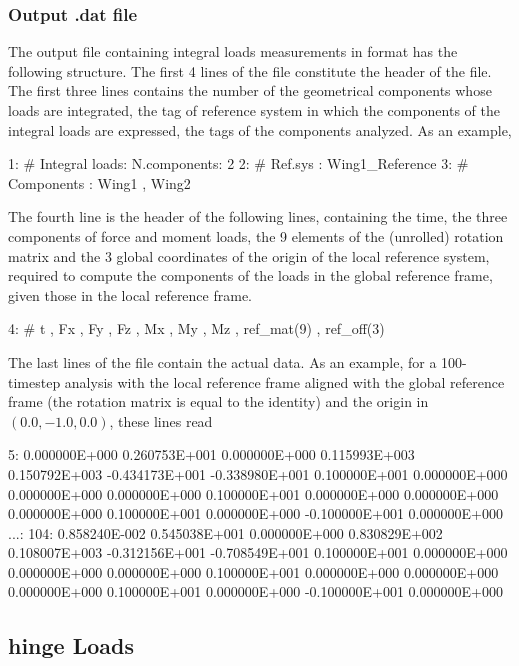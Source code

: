 \subsubsection{Output .dat file}
The output file containing integral loads measurements in  format has 
the following structure.
The first 4 lines of the file constitute the header of the file. The first three 
lines contains the number of the geometrical components  whose loads 
are integrated, the tag of reference system in which the components of the integral 
loads are expressed, the tags of the  components analyzed. As an example,
\begin{inputfile}
  1:  # Integral loads: N.components: 2
  2:  #                 Ref.sys     : Wing1_Reference
  3:  #                 Components  : Wing1 , Wing2
\end{inputfile}
The fourth line is the header of the following lines, containing the time, 
the three components of force and moment loads, the 9 elements of the (unrolled) 
rotation matrix and the 3 global coordinates of the origin of the local reference 
system, required to compute the components of the loads in the global reference 
frame, given those in the local reference frame.
\begin{inputfile}
  4:  #  t , Fx , Fy , Fz , Mx , My , Mz , ref_mat(9) , ref_off(3) 
\end{inputfile}
The last lines of the file contain the actual data. As an example, for a 
100-timestep analysis with the local reference frame  
aligned with the global reference frame (the rotation matrix is equal to the identity) 
and the origin in $(0.0,-1.0,0.0)$, these lines read
\begin{inputfile}
  5: 0.000000E+000  0.260753E+001  0.000000E+000  0.115993E+003
     0.150792E+003 -0.434173E+001 -0.338980E+001  0.100000E+001
     0.000000E+000  0.000000E+000  0.000000E+000  0.100000E+001
     0.000000E+000  0.000000E+000  0.000000E+000  0.100000E+001
     0.000000E+000 -0.100000E+001  0.000000E+000
...:
104: 0.858240E-002  0.545038E+001  0.000000E+000  0.830829E+002
     0.108007E+003 -0.312156E+001 -0.708549E+001  0.100000E+001
     0.000000E+000  0.000000E+000  0.000000E+000  0.100000E+001
     0.000000E+000  0.000000E+000  0.000000E+000  0.100000E+001
     0.000000E+000 -0.100000E+001  0.000000E+000
\end{inputfile}

\subsection{hinge Loads}

